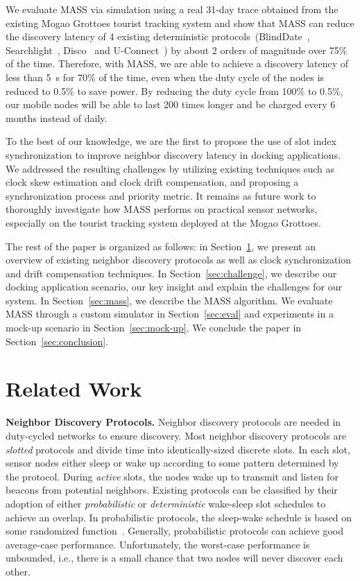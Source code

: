 \documentclass[twoside,twocolumn]{article}
\begin{document}
We evaluate MASS via simulation using a real 31-day trace obtained from the existing Mogao Grottoes tourist tracking system
and show that MASS can reduce the discovery latency of 4 existing deterministic protocols~(BlindDate~\citep{wang13blinddate}, 
Searchlight~\citep{bakht2012searchlight}, Disco~\citep{Dutta2008Practical} and U-Connect~\citep{kandhalu2010u}) by about 2 
orders of magnitude over 75\% of the time. Therefore, with MASS, we are able to achieve a discovery latency of less than 5~s
for 70\% of the time, even when the duty cycle of the nodes is reduced to 0.5\% to save power. By reducing the duty cycle
from 100\% to 0.5\%, our mobile nodes will be able to last 200 times longer and be charged every 6 months instead of daily.

To the best of our knowledge, we are the first to propose the use of slot index synchronization to improve neighbor discovery
latency in docking applications. We addressed the resulting challenges by utilizing existing techniques such as clock skew
estimation and clock drift compensation, and proposing a synchronization process and priority metric. It remains as future
work to thoroughly investigate how MASS performs on practical sensor networks, especially on the tourist tracking system
deployed at the Mogao Grottoes.

The rest of the paper is organized as follows: in Section~\ref{sec:related}, we present an overview of existing neighbor 
discovery protocols as well as clock synchronization and drift compensation techniques. In Section~\ref{sec:challenge}, 
we describe our docking application scenario, our key insight and explain the challenges for our system. In Section~\ref{sec:mass}, 
we describe the MASS algorithm. We evaluate MASS through a custom simulator in Section~\ref{sec:eval} and experiments in
a mock-up scenario in Section~\ref{sec:mock-up}. We conclude the paper in Section~\ref{sec:conclusion}.

\section{Related Work}
\label{sec:related}

{\bf Neighbor Discovery Protocols.} Neighbor discovery protocols are needed in duty-cycled 
networks to ensure discovery. Most neighbor discovery protocols are \emph{slotted} protocols
and divide time into identically-sized discrete slots. In each slot, sensor nodes either
sleep or wake up according to some pattern determined by the protocol. During \emph{active}
slots, the nodes wake up to transmit and listen for beacons from potential neighbors.
Existing protocols can be classified by their adoption of either \emph{probabilistic} or 
\emph{deterministic} wake-sleep slot schedules to achieve an overlap. In probabilistic 
protocols, the sleep-wake schedule is based on some randomized function~\citep{mcglynn2001birthday}. 
Generally, probabilistic protocols can achieve good average-case performance. Unfortunately, 
the worst-case performance is unbounded, i.e., there is a small chance that two nodes will 
never discover each other.
\end{document}
